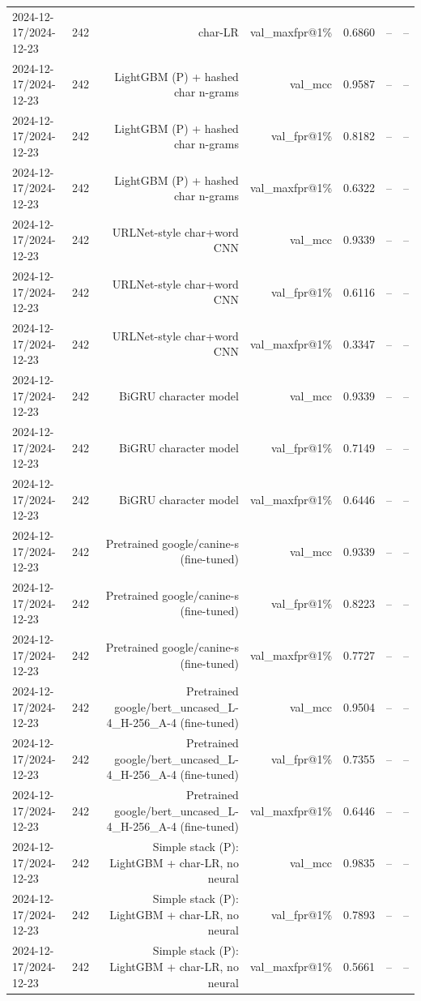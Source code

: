 \begin{table}[t]
\begin{tabular}{llrrrrr}
2024-12-17/2024-12-23 & 242 & char-LR & val\_maxfpr@1\% & 0.6860 & -- & -- \\
2024-12-17/2024-12-23 & 242 & LightGBM (P) + hashed char n-grams & val\_mcc & 0.9587 & -- & -- \\
2024-12-17/2024-12-23 & 242 & LightGBM (P) + hashed char n-grams & val\_fpr@1\% & 0.8182 & -- & -- \\
2024-12-17/2024-12-23 & 242 & LightGBM (P) + hashed char n-grams & val\_maxfpr@1\% & 0.6322 & -- & -- \\
2024-12-17/2024-12-23 & 242 & URLNet-style char+word CNN & val\_mcc & 0.9339 & -- & -- \\
2024-12-17/2024-12-23 & 242 & URLNet-style char+word CNN & val\_fpr@1\% & 0.6116 & -- & -- \\
2024-12-17/2024-12-23 & 242 & URLNet-style char+word CNN & val\_maxfpr@1\% & 0.3347 & -- & -- \\
2024-12-17/2024-12-23 & 242 & BiGRU character model & val\_mcc & 0.9339 & -- & -- \\
2024-12-17/2024-12-23 & 242 & BiGRU character model & val\_fpr@1\% & 0.7149 & -- & -- \\
2024-12-17/2024-12-23 & 242 & BiGRU character model & val\_maxfpr@1\% & 0.6446 & -- & -- \\
2024-12-17/2024-12-23 & 242 & Pretrained google/canine-s (fine-tuned) & val\_mcc & 0.9339 & -- & -- \\
2024-12-17/2024-12-23 & 242 & Pretrained google/canine-s (fine-tuned) & val\_fpr@1\% & 0.8223 & -- & -- \\
2024-12-17/2024-12-23 & 242 & Pretrained google/canine-s (fine-tuned) & val\_maxfpr@1\% & 0.7727 & -- & -- \\
2024-12-17/2024-12-23 & 242 & Pretrained google/bert\_uncased\_L-4\_H-256\_A-4 (fine-tuned) & val\_mcc & 0.9504 & -- & -- \\
2024-12-17/2024-12-23 & 242 & Pretrained google/bert\_uncased\_L-4\_H-256\_A-4 (fine-tuned) & val\_fpr@1\% & 0.7355 & -- & -- \\
2024-12-17/2024-12-23 & 242 & Pretrained google/bert\_uncased\_L-4\_H-256\_A-4 (fine-tuned) & val\_maxfpr@1\% & 0.6446 & -- & -- \\
2024-12-17/2024-12-23 & 242 & Simple stack (P): LightGBM + char-LR, no neural & val\_mcc & 0.9835 & -- & -- \\
2024-12-17/2024-12-23 & 242 & Simple stack (P): LightGBM + char-LR, no neural & val\_fpr@1\% & 0.7893 & -- & -- \\
2024-12-17/2024-12-23 & 242 & Simple stack (P): LightGBM + char-LR, no neural & val\_maxfpr@1\% & 0.5661 & -- & -- \\

\end{tabular}
\end{table}
